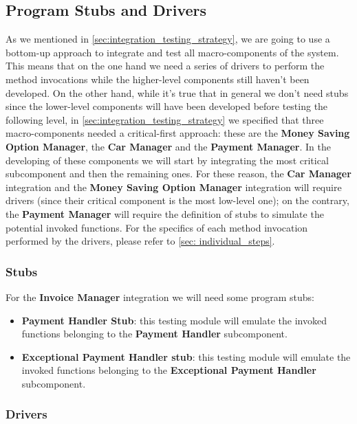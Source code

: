 	\subsection{Program Stubs and Drivers}
	
	As we mentioned in \autoref{sec:integration_testing_strategy}, we are going to use a bottom-up approach to integrate and test all macro-components of the system. This means that on the one hand we need a series of drivers to perform the method invocations while the higher-level components still haven't been developed. On the other hand, while it's true that in general we don't need stubs since the lower-level components will have been developed before testing the following level, in \autoref{sec:integration_testing_strategy} we specified that three macro-components needed a critical-first approach: these are the \textbf{Money Saving Option Manager}, the \textbf{Car Manager} and the \textbf{Payment Manager}. In the developing of these components we will start by integrating the most critical subcomponent and then the remaining ones. For these reason, the \textbf{Car Manager} integration and the \textbf{Money Saving Option Manager} integration will require drivers (since their critical component is the most low-level one); on the contrary, the \textbf{Payment Manager} will require the definition of stubs to simulate the potential invoked functions.
	For the specifics of each method invocation performed by the drivers, please refer to \autoref{sec: individual_steps}.
		
		\subsubsection{Stubs}
		\label{sec:stubs}
			For the \textbf{Invoice Manager} integration we will need some program stubs:
			\begin{itemize}
				\item \textbf{Payment Handler Stub}: this testing module will emulate the invoked functions belonging to the \textbf{Payment Handler} subcomponent.
				\item \textbf{Exceptional Payment Handler stub}: this testing module will emulate the invoked functions belonging to the \textbf{Exceptional Payment Handler} subcomponent.
			\end{itemize} 	

		
		
		\subsubsection{Drivers}
		\label{sec:drivers}

